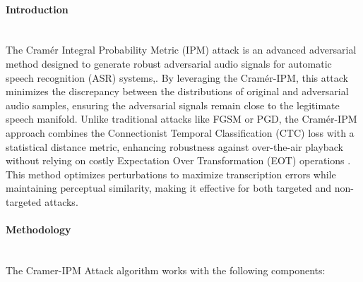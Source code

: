 \documentclass[../main.tex]{subfiles}
\begin{document}
\paragraph{Introduction}\leavevmode\\
The Cramér Integral Probability Metric (IPM) attack is an advanced adversarial method designed to generate robust adversarial audio signals for automatic speech recognition (ASR) systems,\cite{esmaeilpour2021towards}. By leveraging the Cramér-IPM, this attack minimizes the discrepancy between the distributions of original and adversarial audio samples, ensuring the adversarial signals remain close to the legitimate speech manifold. Unlike traditional attacks like FGSM or PGD, the Cramér-IPM approach combines the Connectionist Temporal Classification (CTC) loss with a statistical distance metric, enhancing robustness against over-the-air playback without relying on costly Expectation Over Transformation (EOT) operations \cite{esmaeilpour2021towards}. This method optimizes perturbations to maximize transcription errors while maintaining perceptual similarity, making it effective for both targeted and non-targeted attacks.

\paragraph{Methodology}\leavevmode\\
The Cramer-IPM Attack algorithm works with the following components:
\end{document}
